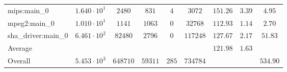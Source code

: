 \begin{tabular}{|l|c|c|c|c|c|c|c|c|}
mips:main\_0            & $ 1.640 \cdot 10^{1}  $ & $ 2480   $ & $ 831   $ & $ 4   $ & $ 3072   $ & $ 151.26      $ & $ 3.39    $ & $ 4.95    $ \\
mpeg2:main\_0           & $ 1.010 \cdot 10^{1}  $ & $ 1141   $ & $ 1063  $ & $ 0   $ & $ 32768  $ & $ 112.93      $ & $ 1.14    $ & $ 2.70    $ \\
sha\_driver:main\_0     & $ 6.461 \cdot 10^{2}  $ & $ 82480  $ & $ 2796  $ & $ 0   $ & $ 117248 $ & $ 127.67      $ & $ 2.17    $ & $ 51.83   $ \\
\hline
Average                 & $                     $ & $        $ & $       $ & $     $ & $        $ & $ 121.98      $ & $ 1.63    $ & $         $ \\
\hline
Overall                 & $ 5.453 \cdot 10^{3}  $ & $ 648710 $ & $ 59311 $ & $ 285 $ & $ 734784 $ & $             $ & $         $ & $ 534.90  $ \\
\hline
\end{tabular}
